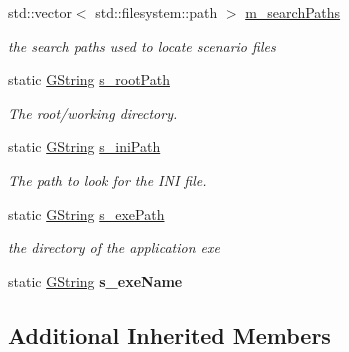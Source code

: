 \begin{DoxyCompactItemize}
\item 
std\+::vector$<$ std\+::filesystem\+::path $>$ \mbox{\hyperlink{classrev_1_1_file_manager_aa73611e8b6e1c939e656ec13dcd6cbe3}{m\+\_\+search\+Paths}}
\begin{DoxyCompactList}\small\item\em the search paths used to locate scenario files \end{DoxyCompactList}\item 
\mbox{\label{classrev_1_1_file_manager_ac953e90e3625e5f8809d6ef229aec429}} 
static \mbox{\hyperlink{classrev_1_1_g_string}{G\+String}} \mbox{\hyperlink{classrev_1_1_file_manager_ac953e90e3625e5f8809d6ef229aec429}{s\+\_\+root\+Path}}
\begin{DoxyCompactList}\small\item\em The root/working directory. \end{DoxyCompactList}\item 
\mbox{\label{classrev_1_1_file_manager_a394681beab945fff9b69077d3f608ae2}} 
static \mbox{\hyperlink{classrev_1_1_g_string}{G\+String}} \mbox{\hyperlink{classrev_1_1_file_manager_a394681beab945fff9b69077d3f608ae2}{s\+\_\+ini\+Path}}
\begin{DoxyCompactList}\small\item\em The path to look for the I\+NI file. \end{DoxyCompactList}\item 
\mbox{\label{classrev_1_1_file_manager_a36271cf1d18e96a3c655e77da0f98065}} 
static \mbox{\hyperlink{classrev_1_1_g_string}{G\+String}} \mbox{\hyperlink{classrev_1_1_file_manager_a36271cf1d18e96a3c655e77da0f98065}{s\+\_\+exe\+Path}}
\begin{DoxyCompactList}\small\item\em the directory of the application exe \end{DoxyCompactList}\item 
\mbox{\label{classrev_1_1_file_manager_a678c00748066c324d3558beb6edad73f}} 
static \mbox{\hyperlink{classrev_1_1_g_string}{G\+String}} {\bfseries s\+\_\+exe\+Name}
\end{DoxyCompactItemize}
\subsection*{Additional Inherited Members}


